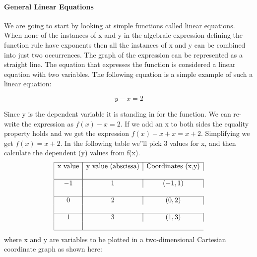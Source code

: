 \paragraph{General Linear Equations}



We are going to start by looking at simple functions called linear equations. When none of the instances of x and y in the algebraic expression defining the function rule have exponents then all the instances of x and y can be combined into just two occurrences. The graph of the expression can be represented as a straight line. The equation that expresses the function is considered a linear equation with two variables. The following equation is a simple example of such a linear equation:



$$y - x = 2$$



Since y is the dependent variable it is standing in for the function. We can re-write the expression as $f(x) - x = 2$. If we add an x to both sides the equality property holds and we get the expression $f(x) - x + x = x + 2$. Simplifying we get $f(x) = x + 2$. In the following table we''ll pick 3 values for x, and then calculate the dependent (y) values from f(x).
$$
\begin{array}{|c|c|c|}

\hline

\text{x value} & \text{y value (abscissa)} & \text{Coordinates (x,y)} \\\\ 

\hline

-1 & 1 & (-1, 1) \\\\ 

\hline

0 & 2 & (0, 2) \\\\ 

\hline

1 & 3 & (1, 3) \\\\ 

\hline

\end{array}
$$
where x and y are variables to be plotted in a two-dimensional Cartesian coordinate graph as shown here:






